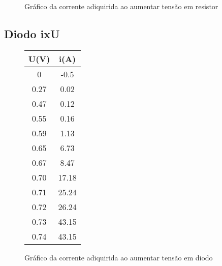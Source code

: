         \begin{figure} [H] 
            \centering
            \caption{Gráfico da corrente adiquirida ao aumentar tensão em resistor}
            \label{fig:graphR}
        \end{figure}

    \subsection{Diodo ixU}
        \begin{figure} [H] 
            \centering
            \begin{tabular}{||c | c||}
                \hline
                U(V)    &   i(A)    \\
                \hline
                0       &   -0.5    \\
                0.27    &   0.02    \\
                0.47    &   0.12    \\
                0.55    &   0.16    \\
                0.59    &   1.13    \\
                0.65    &   6.73    \\
                0.67    &   8.47    \\
                0.70    &   17.18   \\
                0.71    &   25.24   \\
                0.72    &   26.24   \\
                0.73    &   43.15   \\
                0.74    &   43.15   \\
                \hline
            \end{tabular}
            \caption{Gráfico da corrente adiquirida ao aumentar tensão em diodo}
            \label{fig:tableD}
        \end{figure}

